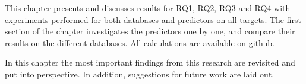 

This chapter presents and discusses results for RQ1, RQ2, RQ3 and RQ4 with experiments performed for both databases and predictors on all targets. The first section of the chapter investigates the predictors one by one, and compare their results on the different databases. All calculations are available on \href{https://github.com/sondrt/Machine-Learning-the-Voltage-Capacity-and-Energy-density-of-Electrode-Materials}{github}.




In this chapter the most important findings from this research are revisited and put into perspective. In addition, suggestions for future work are laid out.


